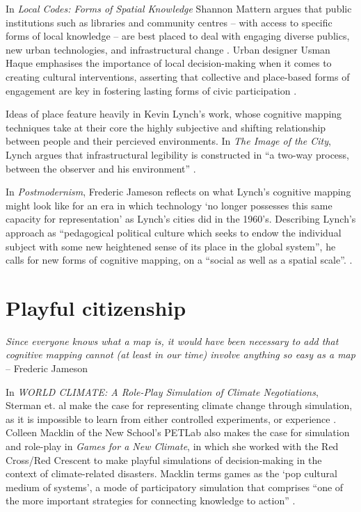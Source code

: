 \documentclass[nofonts,nols,justified,nobib]{tufte-book}
\begin{document}
In \emph{Local Codes: Forms of Spatial Knowledge} Shannon Mattern argues that public institutions such as libraries and community centres -- with access to specific forms of local knowledge -- are best placed to deal with engaging diverse publics, new urban technologies, and infrastructural change \cite{mattern_local_2019}. Urban designer Usman Haque emphasises the importance of local decision-making when it comes to creating cultural interventions, asserting that collective and place-based forms of engagement are key in fostering lasting forms of civic participation \cite{haque_citizen_2017, haque_notes_2008}. 

Ideas of place feature heavily in Kevin Lynch's work, whose cognitive mapping techniques take at their core the highly subjective and shifting relationship between people and their percieved environments. In \emph{The Image of the City}, Lynch argues that infrastructural legibility is constructed in ``a two-way process, between the observer and his environment'' \cite{lynch_image_1960}.

In \emph{Postmodernism}, Frederic Jameson reflects on what Lynch's cognitive mapping might look like for an era in which technology `no longer possesses this same capacity for representation' as Lynch's cities did in the 1960's. Describing Lynch's approach as ``pedagogical political culture which seeks to endow the individual subject with some new heightened sense of its place in the global system'', he calls for new forms of cognitive mapping, on a ``social as well as a spatial scale''. \cite{jameson_postmodernism_1991}.


\section*{Playful citizenship}

\begin{flushright}
\emph{Since everyone knows what a map is, it would have been necessary to add that cognitive mapping cannot (at least in our time) involve anything so easy as a map}\cite{jameson_postmodernism_1991} \\
-- Frederic Jameson
\end{flushright}

In \emph{WORLD CLIMATE: A Role-Play Simulation of Climate Negotiations}, Sterman et. al make the case for representing climate change through simulation, as it is impossible to learn from either controlled experiments, or experience \cite{sterman_world_2015}. Colleen Macklin of the New School's PETLab also makes the case for simulation and role-play in \emph{Games for a New Climate}, in which she worked with the Red Cross/Red Crescent to make playful simulations of decision-making in the context of climate-related disasters. Macklin terms games as the `pop cultural medium of systems', a mode of participatory simulation that comprises ``one of the more important strategies for connecting knowledge to action'' \cite{macklin_games_2013}.
\end{document}
